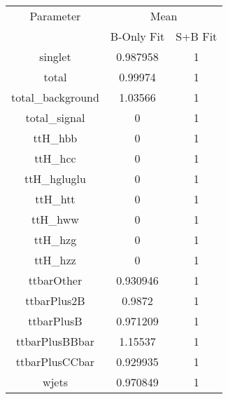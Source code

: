 \begin{table}
\centering

\begin{tabular}{ccc}
\toprule
Parameter & \multicolumn{2}{c}{Mean}\\
 & B-Only Fit & S+B Fit\\
\midrule
singlet & \num{0.987958} & \num{1}\\
total & \num{0.99974} & \num{1}\\
total\_background & \num{1.03566} & \num{1}\\
total\_signal & \num{0} & \num{1}\\
ttH\_hbb & \num{0} & \num{1}\\
ttH\_hcc & \num{0} & \num{1}\\
ttH\_hgluglu & \num{0} & \num{1}\\
ttH\_htt & \num{0} & \num{1}\\
ttH\_hww & \num{0} & \num{1}\\
ttH\_hzg & \num{0} & \num{1}\\
ttH\_hzz & \num{0} & \num{1}\\
ttbarOther & \num{0.930946} & \num{1}\\
ttbarPlus2B & \num{0.9872} & \num{1}\\
ttbarPlusB & \num{0.971209} & \num{1}\\
ttbarPlusBBbar & \num{1.15537} & \num{1}\\
ttbarPlusCCbar & \num{0.929935} & \num{1}\\
wjets & \num{0.970849} & \num{1}\\
\bottomrule
\end{tabular}
\end{table}